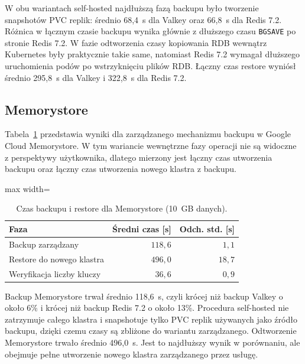 \FloatBarrier

W obu wariantach self-hosted najdłuższą fazą backupu było tworzenie snapshotów PVC replik: średnio 68{,}4~s dla Valkey oraz 66{,}8~s dla Redis 7.2. Różnica w łącznym czasie backupu wynika głównie z dłuższego czasu \texttt{BGSAVE} po stronie Redis 7.2. W fazie odtworzenia czasy kopiowania RDB wewnątrz Kubernetes były praktycznie takie same, natomiast Redis 7.2 wymagał dłuższego uruchomienia podów po wstrzyknięciu plików RDB. Łączny czas restore wyniósł średnio 295{,}8~s dla Valkey i 322{,}8~s dla Redis 7.2.

\subsection{Memorystore}

Tabela~\ref{tab:backup-memorystore} przedstawia wyniki dla zarządzanego mechanizmu backupu w Google Cloud Memorystore. W tym wariancie wewnętrzne fazy operacji nie są widoczne z perspektywy użytkownika, dlatego mierzony jest łączny czas utworzenia backupu oraz łączny czas utworzenia nowego klastra z backupu.

\begin{table}[htbp]
\centering
\caption{Czas backupu i restore dla Memorystore (10~GB danych).}
\label{tab:backup-memorystore}
\begin{adjustbox}{max width=\textwidth}
\begin{tabular}{lrr}
\toprule
Faza & Średni czas [s] & Odch. std. [s] \\
\midrule
Backup zarządzany & $118{,}6$ & $1{,}1$ \\
Restore do nowego klastra & $496{,}0$ & $18{,}7$ \\
Weryfikacja liczby kluczy & $36{,}6$ & $0{,}9$ \\
\bottomrule
\end{tabular}
\end{adjustbox}
\end{table}

\FloatBarrier

Backup Memorystore trwał średnio 118{,}6~s, czyli krócej niż backup Valkey o około 6\% i krócej niż backup Redis 7.2 o około 13\%. Procedura self-hosted nie zatrzymuje całego klastra i snapshotuje tylko PVC replik używanych jako źródło backupu, dzięki czemu czasy są zbliżone do wariantu zarządzanego. Odtworzenie Memorystore trwało średnio 496{,}0~s. Jest to najdłuższy wynik w porównaniu, ale obejmuje pełne utworzenie nowego klastra zarządzanego przez usługę.

